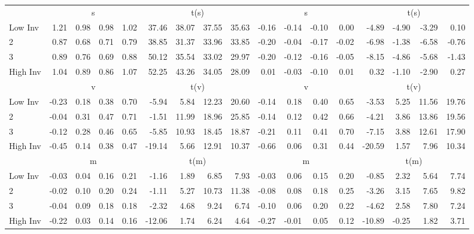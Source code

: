 \begin{table}[!ht]
\begin{tabular}{lrrrrrrrrrrrrrrrr}
  
     & \multicolumn{4}{c}{s} & \multicolumn{4}{c}{t(s)}  & \multicolumn{4}{c}{s} & \multicolumn{4}{c}{t(s)}   \\
     \cmidrule(r){2-5} \cmidrule(r){6-9}  \cmidrule(r){10-13} \cmidrule(r){14-17} 
    Low Inv  & 1.21  & 0.98  & 0.98  & 1.02  & 37.46  & 38.07  & 37.55  & 35.63  & -0.16  & -0.14  & -0.10  & 0.00  & -4.89  & -4.90  & -3.29  & 0.10   \\
    2  & 0.87  & 0.68  & 0.71  & 0.79  & 38.85  & 31.37  & 33.96  & 33.85  & -0.20  & -0.04  & -0.17  & -0.02  & -6.98  & -1.38  & -6.58  & -0.76   \\
    3  & 0.89  & 0.76  & 0.69  & 0.88  & 50.12  & 35.54  & 33.02  & 29.97  & -0.20  & -0.12  & -0.16  & -0.05  & -8.15  & -4.86  & -5.68  & -1.43   \\
    High Inv  & 1.04  & 0.89  & 0.86  & 1.07  & 52.25  & 43.26  & 34.05  & 28.09  & 0.01  & -0.03  & -0.10  & 0.01  & 0.32  & -1.10  & -2.90  & 0.27   \\
    
  
     & \multicolumn{4}{c}{v} & \multicolumn{4}{c}{t(v)}  & \multicolumn{4}{c}{v} & \multicolumn{4}{c}{t(v)}   \\
     \cmidrule(r){2-5} \cmidrule(r){6-9}  \cmidrule(r){10-13} \cmidrule(r){14-17} 
    Low Inv  & -0.23  & 0.18  & 0.38  & 0.70  & -5.94  & 5.84  & 12.23  & 20.60  & -0.14  & 0.18  & 0.40  & 0.65  & -3.53  & 5.25  & 11.56  & 19.76   \\
    2  & -0.04  & 0.31  & 0.47  & 0.71  & -1.51  & 11.99  & 18.96  & 25.85  & -0.14  & 0.12  & 0.42  & 0.66  & -4.21  & 3.86  & 13.86  & 19.56   \\
    3  & -0.12  & 0.28  & 0.46  & 0.65  & -5.85  & 10.93  & 18.45  & 18.87  & -0.21  & 0.11  & 0.41  & 0.70  & -7.15  & 3.88  & 12.61  & 17.90   \\
    High Inv  & -0.45  & 0.14  & 0.38  & 0.47  & -19.14  & 5.66  & 12.91  & 10.37  & -0.66  & 0.06  & 0.31  & 0.44  & -20.59  & 1.57  & 7.96  & 10.34   \\
    
  
     & \multicolumn{4}{c}{m} & \multicolumn{4}{c}{t(m)}  & \multicolumn{4}{c}{m} & \multicolumn{4}{c}{t(m)}   \\
     \cmidrule(r){2-5} \cmidrule(r){6-9}  \cmidrule(r){10-13} \cmidrule(r){14-17} 
    Low Inv  & -0.03  & 0.04  & 0.16  & 0.21  & -1.16  & 1.89  & 6.85  & 7.93  & -0.03  & 0.06  & 0.15  & 0.20  & -0.85  & 2.32  & 5.64  & 7.74   \\
    2  & -0.02  & 0.10  & 0.20  & 0.24  & -1.11  & 5.27  & 10.73  & 11.38  & -0.08  & 0.08  & 0.18  & 0.25  & -3.26  & 3.15  & 7.65  & 9.82   \\
    3  & -0.04  & 0.09  & 0.18  & 0.18  & -2.32  & 4.68  & 9.24  & 6.74  & -0.10  & 0.06  & 0.20  & 0.22  & -4.62  & 2.58  & 7.80  & 7.24   \\
    High Inv  & -0.22  & 0.03  & 0.14  & 0.16  & -12.06  & 1.74  & 6.24  & 4.64  & -0.27  & -0.01  & 0.05  & 0.12  & -10.89  & -0.25  & 1.82  & 3.71   \\
    

\end{tabular}
\end{table}

